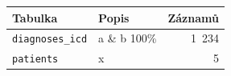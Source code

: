 \begin{tabular}{llr}
\toprule
Tabulka & Popis & Záznamů\\
\midrule
\texttt{diagnoses\_icd} & a \& b 100\% & 1 234\\
\texttt{patients} & x & 5\\
\bottomrule
\end{tabular}
